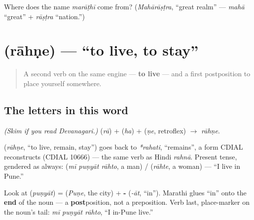 \begin{tcolorbox}[breakable,colback=teal!4,colframe=teal!35!black,title={Before you move on}]
Where does the name \emph{marāṭhī} come from? (\emph{Mahārāṣṭra}, \textquotedblleft{}great realm\textquotedblright{} — \emph{mahā} \textquotedblleft{}great\textquotedblright{} + \emph{rāṣṭra} \textquotedblleft{}nation.\textquotedblright{})
\end{tcolorbox}
\section[\texorpdfstring{\mr{राहणे} (rāhṇe)}{राहणे (rāhṇe)}]{ (rāhṇe) — \textquotedblleft{}to live, to stay\textquotedblright{}}

\label{lesson:MR-C05-rahne}



\begin{quote}
A second verb on the same engine — \textbf{to live} — and a first postposition to place yourself somewhere.
\end{quote}

\subsection*{The letters in this word}
\emph{(Skim if you read Devanagari.)} \textbf{} (\emph{rā}) + \textbf{} (\emph{ha}) + \textbf{} (\emph{ṇe}, retroflex) $\to$ \textbf{} \emph{rāhṇe}.

\begin{cousinweb}
\textbf{} (\emph{rāhṇe}, \textquotedblleft{}to live, remain, stay\textquotedblright{}) goes back to \emph{*rahati}, \textquotedblleft{}remains\textquotedblright{}, a form CDIAL reconstructs (CDIAL 10666) — the same verb as Hindi \emph{rahnā}. Present tense, gendered as always: \textbf{  } (\emph{mī puṇyāt rāhto}, a man) / \textbf{} (\emph{rāhte}, a woman) — \textquotedblleft{}I live in Pune.\textquotedblright{}
\end{cousinweb}

\begin{grammarlens}[title={Grammar Lens: \textquotedblleft{}in\textquotedblright{} comes \emph{after} the noun}]
Look at \textbf{} (\emph{puṇyāt}) = \textbf{} (\emph{Puṇe}, the city) + \textbf{-} (\emph{-āt}, \textquotedblleft{}in\textquotedblright{}). Marathi glues \textquotedblleft{}in\textquotedblright{} onto the \textbf{end} of the noun — a \textbf{post}position, not a preposition. Verb last, place-marker on the noun's tail: \emph{mī puṇyāt rāhto}, \textquotedblleft{}I in-Pune live.\textquotedblright{}
\end{grammarlens}


